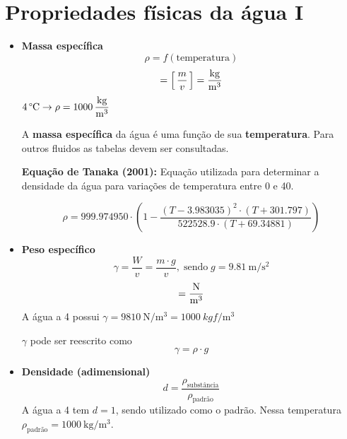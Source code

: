 \documentclass[
	a4paper, 
	12pt, 
	brazilian
]{article}
\begin{document}
	\section{Propriedades físicas da água I}
	
	\begin{itemize}
		\item\textbf{Massa específica}
			\begin{equation}
				\rho=f(\textrm{temperatura})
			\end{equation}
			\begin{equation}
				[\,\rho\,]=\left[\,\dfrac{m}{v}\,\right]=\SI{}{\dfrac{\kilogram}{\meter^{3}}}
			\end{equation}
			$\SI{4}{\SIUnitSymbolCelsius}\rightarrow\rho=\SI{1000}{\dfrac{\kilogram}{\meter^{3}}}$
			
			A \textbf{massa específica} da água é uma função de sua \textbf{temperatura}. Para outros fluidos as tabelas devem ser consultadas.	
			
			\textbf{Equação de Tanaka (2001):}
			Equação utilizada para determinar a densidade da água para variações de temperatura entre \SI{0}{\SIUnitSymbolCelsius} e \SI{40}{\SIUnitSymbolCelsius}.
			
			\begin{equation}
			\rho=999.974950\cdot\left(1-\dfrac{(T-3.983035)^{2}\cdot(T+301.797)}{522528.9\cdot (T+69.34881)}\right)
			\end{equation}	
		\item\textbf{Peso específico}
			\begin{equation}
				\gamma=\dfrac{W}{v}=\dfrac{m\cdot g}{v},\;\textrm{sendo}\;g=\SI{9.81}{\meter/\second^{2}}
			\end{equation}
			\begin{equation}
				[\,\gamma\,]=\SI{}{\dfrac{\newton}{\meter^{3}}}
			\end{equation}	
			A água a \SI{4}{\SIUnitSymbolCelsius} possui $\gamma=\SI{9810}{\newton/\meter^{3}}=\SI{1000}{kgf/\meter^{3}}$
			
			$\gamma$ pode ser reescrito como
			\begin{equation}
				\gamma=\rho\cdot g
			\end{equation}
		\item\textbf{Densidade (adimensional)}
		\begin{equation}
			d=\dfrac{\rho_{\textrm{substância}}}{\rho_{\textrm{padrão}}}
		\end{equation}
		A água a \SI{4}{\SIUnitSymbolCelsius} tem $d=1$, sendo utilizado como o padrão. Nessa temperatura $\rho_{\textrm{padrão}}=\SI{1000}{\kilogram/\meter^{3}}$.
		

\end{itemize}
\end{document}
